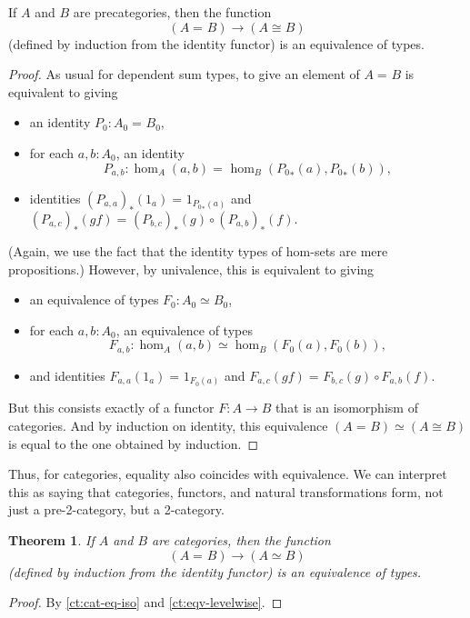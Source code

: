 \documentclass{amsart}
\newcommand{\id}[3][]{\ensuremath{#2 =_{#1} #3}\xspace}
\newcommand{\trans}[2]{\ensuremath{{#1}_{*}\!\left({#2}\right)}\xspace}
\newcommand{\eqv}[2]{\ensuremath{#1 \simeq #2}\xspace}
\newtheorem{thm}{Theorem}[section]
\theoremstyle{definition}
\theoremstyle{remark}
\numberwithin{equation}{section}
\begin{document}
\begin{lem}\label{ct:cat-eq-iso}
  If $A$ and $B$ are precategories, then the function
  \[(\id A B) \to (A\cong B)\]
  (defined by induction from the identity functor) is an equivalence of types.
\end{lem}
\begin{proof}
  As usual for dependent sum types, to give an element of $\id A B$ is equivalent to giving
  \begin{itemize}
  \item an identity $P_0:\id{A_0}{B_0}$,
  \item for each $a,b:A_0$, an identity
    \[P_{a,b}:\id{\hom_A(a,b)}{\hom_B(\trans {P_0} a,\trans {P_0} b)},\]
  \item identities $\id{\trans {(P_{a,a})} {1_a}}{1_{\trans {P_0} a}}$ and $\id{\trans {(P_{a,c})} {gf}}{\trans {(P_{b,c})} g \circ \trans {(P_{a,b})} f}$.
  \end{itemize}
  (Again, we use the fact that the identity types of hom-sets are mere propositions.)
  However, by univalence, this is equivalent to giving
  \begin{itemize}
  \item an equivalence of types $F_0:\eqv{A_0}{B_0}$,
  \item for each $a,b:A_0$, an equivalence of types
    \[F_{a,b}:\eqv{\hom_A(a,b)}{\hom_B(F_0 (a),F_0 (b))},\]
  \item and identities $\id{F_{a,a}(1_a)}{1_{F_0 (a)}}$ and $\id{F_{a,c}(gf)}{F_{b,c} (g)\circ F_{a,b} (f)}$.
  \end{itemize}
  But this consists exactly of a functor $F:A\to B$ that is an isomorphism of categories.
  And by induction on identity, this equivalence $\eqv{(\id A B)}{(A\cong B)}$ is equal to the one obtained by induction.
\end{proof}

Thus, for categories, equality also coincides with equivalence.
We can interpret this as saying that categories, functors, and natural transformations form, not just a pre-2-category, but a 2-category.

\begin{thm}\label{ct:cat-2cat}
  If $A$ and $B$ are categories, then the function
  \[(\id A B) \to (A\simeq B)\]
  (defined by induction from the identity functor) is an equivalence of types.
\end{thm}
\begin{proof}
  By \autoref{ct:cat-eq-iso} and \autoref{ct:eqv-levelwise}.
\end{proof}
\end{document}
